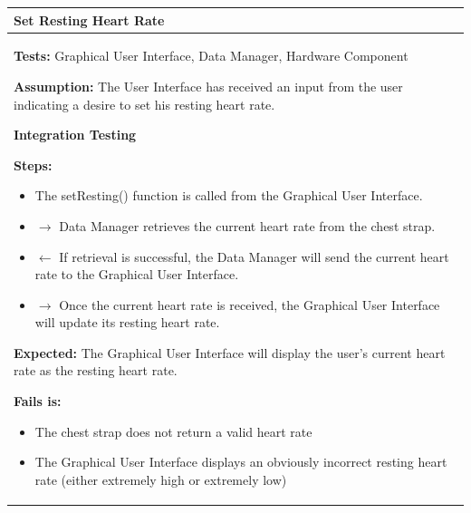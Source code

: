 \documentclass[letterpaper,english, 12pt]{scrreprt}
\begin{document}
\begin{center}
         \begin{tabular}{|C{15cm}|}
                 \hline
                        \textbf{Set Resting Heart Rate} \\
                \hline
                        \begin{flushleft}
                                \textbf{Tests: } Graphical User Interface, Data Manager, Hardware Component
                        \end{flushleft}
                        \begin{flushleft}
                                \textbf{Assumption: } The User Interface has received an input from the user indicating a desire to set his resting heart rate.
                        \end{flushleft}
			\begin{center}
				\textbf{Integration Testing}
			\end{center}
                        \begin{flushleft}
                                \textbf{Steps: }
                        \end{flushleft}
                                \begin{itemize}
                                        \item The setResting() function is called from the Graphical User Interface.
                                        \item $\rightarrow$ Data Manager retrieves the current heart rate from the chest strap.
                                        \item $\leftarrow$ If retrieval is successful, the Data Manager will send the current heart rate to the Graphical User Interface.
                                        \item $\rightarrow$ Once the current heart rate is received, the Graphical User Interface will update its resting heart rate.
                                \end{itemize}
                        \begin{flushleft}
                                \textbf{Expected: } The Graphical User Interface will display the user's current heart rate as the resting heart rate.
                        \end{flushleft}
                        \begin{flushleft}
                                \textbf{Fails is: }
                        \end{flushleft}
                                \begin{itemize}
                                        \item The chest strap does not return a valid heart rate
                                        \item The Graphical User Interface displays an obviously incorrect resting heart rate (either extremely high or extremely low)
                                \end{itemize}\\
                \hline
        \end{tabular}
\end{center}
\end{document}
